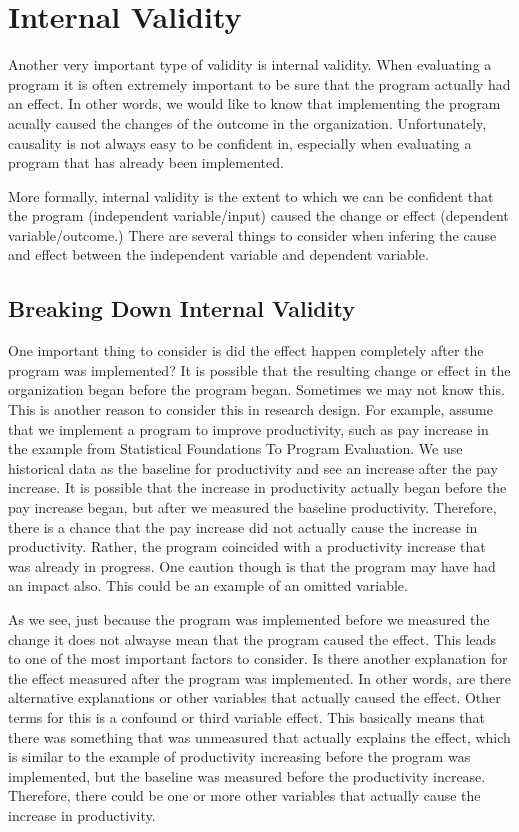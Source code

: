 \documentclass[]{book}
\theoremstyle{definition}
\theoremstyle{definition}
\theoremstyle{definition}
\theoremstyle{remark}
\begin{document}
\hypertarget{internal-validity}{%
\section{Internal Validity}\label{internal-validity}}

Another very important type of validity is internal validity. When
evaluating a program it is often extremely important to be sure that the
program actually had an effect. In other words, we would like to know
that implementing the program acually caused the changes of the outcome
in the organization. Unfortunately, causality is not always easy to be
confident in, especially when evaluating a program that has already been
implemented.

More formally, internal validity is the extent to which we can be
confident that the program (independent variable/input) caused the
change or effect (dependent variable/outcome.) There are several things
to consider when infering the cause and effect between the independent
variable and dependent variable.

\hypertarget{breaking-down-internal-validity}{%
\subsection{Breaking Down Internal
Validity}\label{breaking-down-internal-validity}}

One important thing to consider is did the effect happen completely
after the program was implemented? It is possible that the resulting
change or effect in the organization began before the program began.
Sometimes we may not know this. This is another reason to consider this
in research design. For example, assume that we implement a program to
improve productivity, such as pay increase in the example from
Statistical Foundations To Program Evaluation. We use historical data as
the baseline for productivity and see an increase after the pay
increase. It is possible that the increase in productivity actually
began before the pay increase began, but after we measured the baseline
productivity. Therefore, there is a chance that the pay increase did not
actually cause the increase in productivity. Rather, the program
coincided with a productivity increase that was already in progress. One
caution though is that the program may have had an impact also. This
could be an example of an omitted variable.

As we see, just because the program was implemented before we measured
the change it does not alwayse mean that the program caused the effect.
This leads to one of the most important factors to consider. Is there
another explanation for the effect measured after the program was
implemented. In other words, are there alternative explanations or other
variables that actually caused the effect. Other terms for this is a
confound or third variable effect. This basically means that there was
something that was unmeasured that actually explains the effect, which
is similar to the example of productivity increasing before the program
was implemented, but the baseline was measured before the productivity
increase. Therefore, there could be one or more other variables that
actually cause the increase in productivity.
\end{document}

